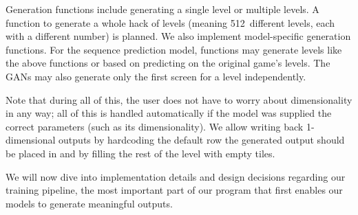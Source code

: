 Generation functions include generating a single level or multiple
levels. A function to generate a whole hack of levels (meaning
512~different levels, each with a different number) is planned. We
also implement model-specific generation functions. For the sequence
prediction model, functions may generate levels like the above
functions or based on predicting on the original game's levels. The
GANs may also generate only the first screen for a level
independently.

Note that during all of this, the user does not have to worry about
dimensionality in any way; all of this is handled automatically if the
model was supplied the correct parameters (such as its
dimensionality). We allow writing back 1-dimensional outputs by
hardcoding the default row the generated output should be placed in
and by filling the rest of the level with empty tiles.

We will now dive into implementation details and design decisions
regarding our training pipeline, the most important part of our
program that first enables our models to generate meaningful outputs.


